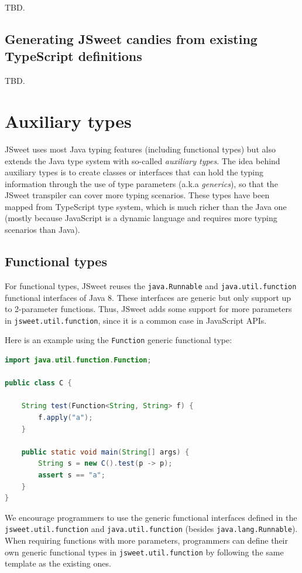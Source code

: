 \documentclass[a4paper]{report}
\begin{document}
TBD.

\section{Generating JSweet candies from existing TypeScript definitions}

TBD.

\chapter{Auxiliary types}

JSweet uses most Java typing features (including functional types) but also extends the Java type system with so-called \emph{auxiliary types}. The idea behind auxiliary types is to create classes or interfaces that can hold the typing information through the use of type parameters (a.k.a \emph{generics}), so that the JSweet transpiler can cover more typing scenarios. These types have been mapped from TypeScript type system, which is much richer than the Java one (mostly because JavaScript is a dynamic language and requires more typing scenarios than Java). 

\section{Functional types}

For functional types, JSweet reuses the \texttt{java.\-Runnable} and \texttt{java.\-util.\-function} functional interfaces of Java 8. These interfaces are generic but only support up to 2-parameter functions. Thus, JSweet adds some support for more parameters in \texttt{jsweet.\-util.\-function}, since it is a common case in JavaScript APIs.

Here is an example using the \texttt{Function} generic functional type:

\begin{lstlisting}[language=Java]
import java.util.function.Function;

public class C {

	String test(Function<String, String> f) {
		f.apply("a");
	}

	public static void main(String[] args) {
		String s = new C().test(p -> p);
		assert s == "a";
	}
}
\end{lstlisting}

We encourage programmers to use the generic functional interfaces defined in the \texttt{jsweet.\-util.\-function} and \texttt{java.\-util.\-function} (besides \texttt{java.\-lang.\-Runnable}). When requiring functions with more parameters, programmers can define their own generic functional types in \texttt{jsweet.\-util.\-function} by following the same template as the existing ones.
\end{document}
